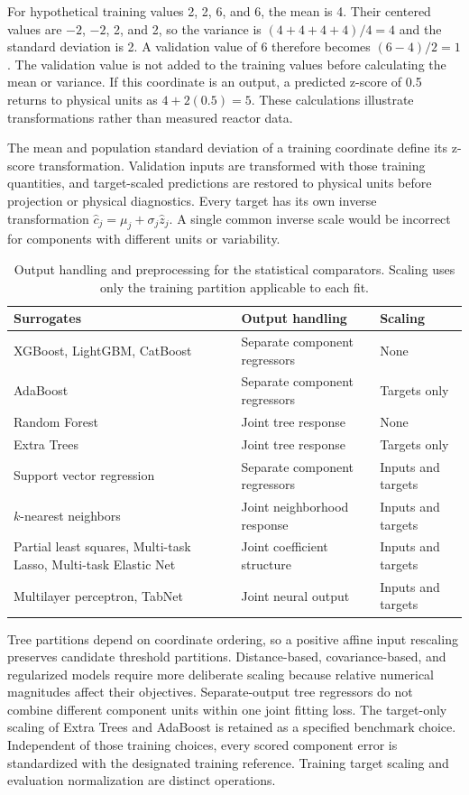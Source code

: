 For hypothetical training values 2, 2, 6, and 6, the mean is 4. Their centered values are $-2$, $-2$, 2, and 2, so the variance is $(4+4+4+4)/4=4$ and the standard deviation is 2. A validation value of 6 therefore becomes $(6-4)/2=1$. The validation value is not added to the training values before calculating the mean or variance. If this coordinate is an output, a predicted z-score of 0.5 returns to physical units as $4+2(0.5)=5$. These calculations illustrate transformations rather than measured reactor data.

The mean and population standard deviation of a training coordinate define its z-score transformation. Validation inputs are transformed with those training quantities, and target-scaled predictions are restored to physical units before projection or physical diagnostics. Every target has its own inverse transformation $\widehat c_j=\mu_j+\sigma_j\widehat z_j$. A single common inverse scale would be incorrect for components with different units or variability.

\begin{table}[htbp]
\centering
\caption{Output handling and preprocessing for the statistical comparators. Scaling uses only the training partition applicable to each fit.}
\label{tab:surrogate_preprocessing}
\small
\begin{tabular}{p{5.1cm}p{3.2cm}p{3.3cm}}
\toprule
Surrogates & Output handling & Scaling\\
\midrule
XGBoost, LightGBM, CatBoost & Separate component regressors & None\\
AdaBoost & Separate component regressors & Targets only\\
Random Forest & Joint tree response & None\\
Extra Trees & Joint tree response & Targets only\\
Support vector regression & Separate component regressors & Inputs and targets\\
$k$-nearest neighbors & Joint neighborhood response & Inputs and targets\\
Partial least squares, Multi-task Lasso, Multi-task Elastic Net & Joint coefficient structure & Inputs and targets\\
Multilayer perceptron, TabNet & Joint neural output & Inputs and targets\\
\bottomrule
\end{tabular}
\end{table}

Tree partitions depend on coordinate ordering, so a positive affine input rescaling preserves candidate threshold partitions. Distance-based, covariance-based, and regularized models require more deliberate scaling because relative numerical magnitudes affect their objectives. Separate-output tree regressors do not combine different component units within one joint fitting loss. The target-only scaling of Extra Trees and AdaBoost is retained as a specified benchmark choice. Independent of those training choices, every scored component error is standardized with the designated training reference. Training target scaling and evaluation normalization are distinct operations.

